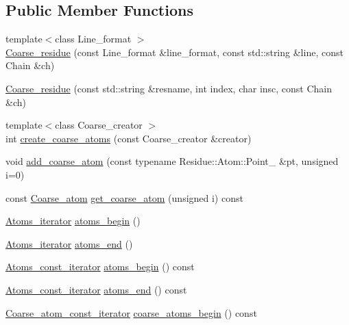 \subsection*{Public Member Functions}
\begin{DoxyCompactItemize}
\item 
{\footnotesize template$<$class Line\+\_\+format $>$ }\\\hyperlink{classESBTL_1_1Coarse__residue_aebedf19bfbb8c04f7413b1618bc5dd32}{Coarse\+\_\+residue} (const Line\+\_\+format \&line\+\_\+format, const std\+::string \&line, const Chain \&ch)
\item 
\hyperlink{classESBTL_1_1Coarse__residue_abde8049914cf69701dbe59f860887bab}{Coarse\+\_\+residue} (const std\+::string \&resname, int index, char insc, const Chain \&ch)
\item 
{\footnotesize template$<$class Coarse\+\_\+creator $>$ }\\int \hyperlink{classESBTL_1_1Coarse__residue_a4a514a6142ad550ade5df531f08d9cdd}{create\+\_\+coarse\+\_\+atoms} (const Coarse\+\_\+creator \&creator)
\item 
void \hyperlink{classESBTL_1_1Coarse__residue_ac261019b3966c7fd3c921217e335c11e}{add\+\_\+coarse\+\_\+atom} (const typename Residue\+::\+Atom\+::\+Point\+\_ \&pt, unsigned i=0)
\item 
const \hyperlink{classESBTL_1_1Coarse__residue_a4e83dc008345f6b828bcd3a67045a051}{Coarse\+\_\+atom} \hyperlink{classESBTL_1_1Coarse__residue_a2dd7b7ebb517675fdb74b006f36d61fc}{get\+\_\+coarse\+\_\+atom} (unsigned i) const
\item 
\hyperlink{group__grp__iters_ga8081408a6d91ed2a777111e2b2651ad4}{Atoms\+\_\+iterator} \hyperlink{group__grp__iters_ga35aadf6bfc69effe4dd4a55b09e8a1ca}{atoms\+\_\+begin} ()
\item 
\hyperlink{group__grp__iters_ga8081408a6d91ed2a777111e2b2651ad4}{Atoms\+\_\+iterator} \hyperlink{group__grp__iters_ga71c3a50b585303176a530b52265b1b9c}{atoms\+\_\+end} ()
\item 
\hyperlink{group__grp__iters_gabb95e73700fd84dbde6e089927e03a6d}{Atoms\+\_\+const\+\_\+iterator} \hyperlink{group__grp__iters_ga9f73288663701102c207280c7af5a523}{atoms\+\_\+begin} () const
\item 
\hyperlink{group__grp__iters_gabb95e73700fd84dbde6e089927e03a6d}{Atoms\+\_\+const\+\_\+iterator} \hyperlink{group__grp__iters_gafa5493ec6a094421db2bfbaf17af3a90}{atoms\+\_\+end} () const
\item 
\hyperlink{group__grp__iters_ga5a4a865846cdde342538df7fc03c80ce}{Coarse\+\_\+atom\+\_\+const\+\_\+iterator} \hyperlink{group__grp__iters_gac0e520e0a924be52cfdfae8921a21d21}{coarse\+\_\+atoms\+\_\+begin} () const

\end{DoxyCompactItemize}

